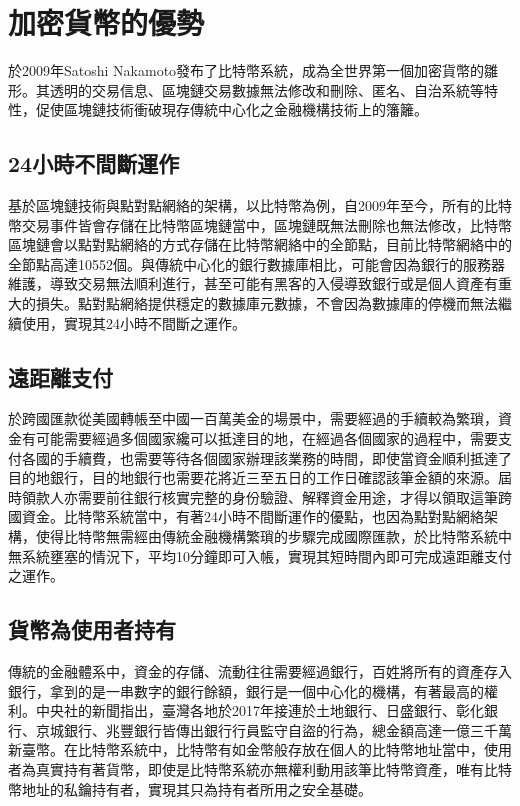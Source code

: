 	\section{加密貨幣的優勢}
	於2009年Satoshi Nakamoto發布了比特幣系統，成為全世界第一個加密貨幣的雛形。其透明的交易信息、區塊鏈交易數據無法修改和刪除、匿名、⾃治系統等特性，促使區塊鏈技術衝破現存傳統中⼼化之⾦融機構技術上的籓籬。

		\subsection{24小時不間斷運作}
		基於區塊鏈技術與點對點網絡的架構，以比特幣為例，自2009年至今，所有的比特幣交易事件皆會存儲在比特幣區塊鏈當中，區塊鏈既無法刪除也無法修改，比特幣區塊鏈會以點對點網絡的方式存儲在比特幣網絡中的全節點，目前比特幣網絡中的全節點高達10552個。與傳統中心化的銀行數據庫相比，可能會因為銀行的服務器維護，導致交易無法順利進行，甚至可能有黑客的入侵導致銀行或是個人資產有重大的損失。點對點網絡提供穩定的數據庫元數據，不會因為數據庫的停機而無法繼續使用，實現其24小時不間斷之運作。
		
		\subsection{遠距離支付}
		於跨國匯款從美國轉帳至中國一百萬美金的場景中，需要經過的手續較為繁瑣，資金有可能需要經過多個國家纔可以抵達目的地，在經過各個國家的過程中，需要支付各國的手續費，也需要等待各個國家辦理該業務的時間，即使當資金順利抵達了目的地銀行，目的地銀行也需要花將近三至五日的工作日確認該筆金額的來源。屆時領款人亦需要前往銀行核實完整的身份驗證、解釋資金用途，才得以領取這筆跨國資金。比特幣系統當中，有著24小時不間斷運作的優點，也因為點對點網絡架構，使得比特幣無需經由傳統金融機構繁瑣的步驟完成國際匯款，於比特幣系統中無系統壅塞的情況下，平均10分鐘即可入帳，實現其短時間內即可完成遠距離支付之運作。

		\subsection{貨幣為使用者持有}
		傳統的金融體系中，資金的存儲、流動往往需要經過銀行，百姓將所有的資產存入銀行，拿到的是一串數字的銀行餘額，銀行是一個中心化的機構，有著最高的權利。中央社的新聞\supercite{Bankguardsstolen}指出，臺灣各地於2017年接連於土地銀行、日盛銀行、彰化銀行、京城銀行、兆豐銀行皆傳出銀行行員監守自盜的行為，總金額高達一億三千萬新臺幣。在比特幣系統中，比特幣有如金幣般存放在個人的比特幣地址當中，使用者為真實持有著貨幣，即使是比特幣系統亦無權利動用該筆比特幣資產，唯有比特幣地址的私鑰持有者，實現其只為持有者所用之安全基礎。

